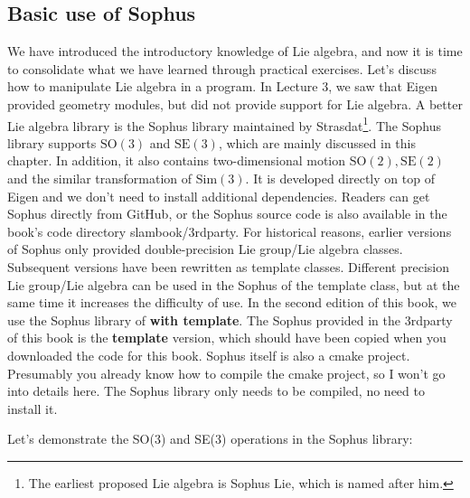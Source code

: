 \subsection{Basic use of Sophus}
We have introduced the introductory knowledge of Lie algebra, and now it is time to consolidate what we have learned through practical exercises. Let's discuss how to manipulate Lie algebra in a program. In Lecture 3, we saw that Eigen provided geometry modules, but did not provide support for Lie algebra. A better Lie algebra library is the Sophus library maintained by Strasdat\footnote{The earliest proposed Lie algebra is Sophus Lie, which is named after him. }. The Sophus library supports $\mathrm{SO}(3)$ and $\mathrm{SE}(3)$, which are mainly discussed in this chapter. In addition, it also contains two-dimensional motion $\mathrm{SO}(2), \mathrm{SE} (2) $ and the similar transformation of $\mathrm{Sim}(3)$. It is developed directly on top of Eigen and we don't need to install additional dependencies. Readers can get Sophus directly from GitHub, or the Sophus source code is also available in the book's code directory slambook/3rdparty. For historical reasons, earlier versions of Sophus only provided double-precision Lie group/Lie algebra classes. Subsequent versions have been rewritten as template classes. Different precision Lie group/Lie algebra can be used in the Sophus of the template class, but at the same time it increases the difficulty of use. In the second edition of this book, we use the Sophus library of \textbf{with template}. The Sophus provided in the 3rdparty of this book is the \textbf{template} version, which should have been copied when you downloaded the code for this book. Sophus itself is also a cmake project. Presumably you already know how to compile the cmake project, so I won't go into details here. The Sophus library only needs to be compiled, no need to install it.

Let's demonstrate the SO(3) and SE(3) operations in the Sophus library:

